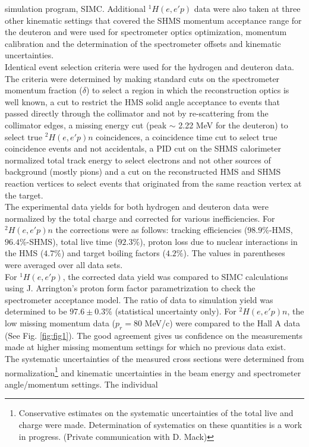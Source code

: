 simulation program, SIMC. Additional $^{1}H(e,e'p)$ data were also taken at three other kinematic settings that covered the SHMS momentum acceptance range for the deuteron and were used for spectrometer optics optimization, 
momentum calibration and the determination of the spectrometer offsets and kinematic uncertainties\cite{cyero_phdthesis}.\\
\indent Identical event selection criteria were used for the hydrogen and deuteron data. The criteria were determined by making standard cuts on the spectrometer momentum fraction ($\delta$) to select a region in which the reconstruction optics
is well known,  a cut to restrict the HMS solid angle acceptance to events that passed directly through the collimator and not by re-scattering from the collimator edges, a missing
energy cut (peak $\sim$ 2.22 MeV for the deuteron) to select true $^{2}H(e,e'p)n$ coincidences, a coincidence time cut to select true coincidence events and not accidentals,  a PID cut on the
SHMS calorimeter normalized total track energy to select electrons and not other sources of background (mostly pions) and a cut on the reconstructed HMS and SHMS reaction vertices to select events that 
originated from the same reaction vertex at the target.\\
\indent The experimental data yields for both hydrogen and deuteron data were normalized by the total charge and corrected for various inefficiencies. For $^{2}H(e,e'p)n$ the corrections
were as follows: tracking efficiencies ($98.9 \%$-HMS, $96.4 \%$-SHMS), total live time ($92.3 \%$), proton loss due to nuclear interactions in the HMS ($4.7 \%$)\cite{cyero_phdthesis} and
target boiling factors ($4.2 \%$)\cite{cyero_phdthesis}. The values in parentheses were averaged over all data sets. \\
\indent For $^{1}H(e,e'p)$, the corrected data yield was compared to SIMC calculations using J. Arrington's proton form factor parametrization\cite{PhysRevC.69.022201} to check the spectrometer acceptance
model. The ratio of data to simulation yield was determined to be $97.6\pm0.3 \%$ (statistical uncertainty only). For $^{2}H(e,e'p)n$, the low missing momentum data ($p_{r}=80$ MeV/c) were compared to the Hall A data (See Fig. \ref{fig:fig1}).
The good agreement gives us confidence on the measurements made at higher missing momentum settings for which no previous data exist. \\
\indent The systematic uncertainties of the measured cross sections were determined from 
normalization\footnote{Conservative estimates on the systematic uncertainties of the total live and charge were made.
Determination of systematics on these quantities is a work in progress. (Private communication with D. Mack)} and kinematic uncertainties in the beam energy and spectrometer angle/momentum settings. The individual

